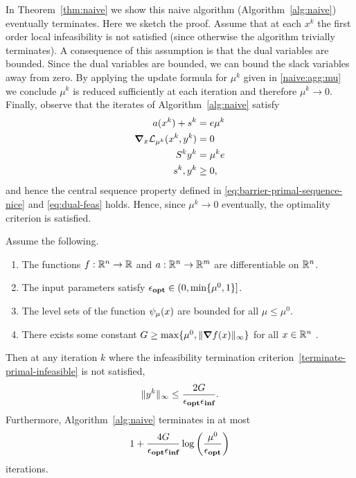\documentclass{article}
\begin{document}
In Theorem~\ref{thm:naive} we show this naive algorithm (Algorithm~\ref{alg:naive}) eventually terminates. Here we sketch the proof. Assume that at each $x^{k}$ the first order local infeasibility is not satisfied (since otherwise the algorithm trivially terminates). A consequence of this assumption is that the dual variables are bounded. Since the dual variables are bounded, we can bound the slack variables away from zero. By applying the update formula for $\mu^{k}$ given in \eqref{naive:agg:mu} we conclude $\mu^{k}$ is reduced sufficiently at each iteration and therefore $\mu^{k} \rightarrow 0$. Finally, observe that the iterates of Algorithm~\ref{alg:naive} satisfy
\begin{subequations}
\begin{flalign}
a(x^{k}) + s^{k} &= e \mu^k \\
\grad_{x} \mathcal{L}_{\mu^k}(x^{k}, y^{k}) &= 0 \\
S^{k} y^{k} &= \mu^k e \\
s^{k}, y^{k} &\ge 0,
\end{flalign}
\end{subequations}
and hence the central sequence property defined in \eqref{eq:barrier-primal-sequence-nice} and \eqref{eq:dual-feas} holds. Hence, since $\mu^k \rightarrow 0$ eventually, the optimality criterion is satisfied.

\begin{theorem}\label{thm:naive}
Assume the following.
\begin{enumerate}
\item The functions $f : \mathbb{R}^{n} \rightarrow \mathbb{R}$ and $a : \mathbb{R}^{n} \rightarrow \mathbb{R}^{m}$ are differentiable on $\mathbb{R}^{n}$.
\item The input parameters satisfy $\epsilon_{\textbf{opt}} \in (0, \min\{ \mu^{0}, 1 \} ]$. %
\item The level sets of the function $\psi_{\mu}(x)$ are bounded for all $\mu \le \mu^{0}$.
\item There exists some constant $G \ge \max\{ \mu^{0}, \| \grad f(x) \|_{\infty} \}$ for all $x \in \mathbb{R}^{n}$ .
\end{enumerate}
Then at any iteration $k$ where the infeasibility termination criterion~\eqref{terminate-primal-infeasible} is not satisfied,
$$
\| y^{k} \|_{\infty} \le \frac{2 G}{\epsilon_{\textbf{opt}} \epsilon_{\textbf{inf}}}.
$$
Furthermore, Algorithm~\ref{alg:naive} terminates in at most 
$$
1 + \frac{4 G}{\epsilon_{\textbf{opt}} \epsilon_{\textbf{inf}} } \log\left( \frac{\mu^{0}}{\epsilon_{\textbf{opt}}} \right)
$$
iterations.
\end{theorem}
\end{document}
